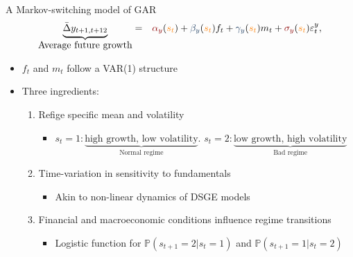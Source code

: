 \documentclass[xcolor=dvipsnames, xcolor=table, 10pt]{beamer}
\newcommand{\pb}[1]{{\color{fedblue}#1}}
\newcommand{\rr}[1]{{\color{darkred}#1}}
\newcommand{\orr}[1]{{\color{orange}#1}}
\begin{document}
\begin{frame}{A Markov-switching model of GAR}
\label{main:msmodel}
\vspace*{-0.2in}
\begin{eqnarray*}
\underbrace{\bar{\Delta} {y}_{t+1,t+12}}_{\mbox{Average future growth}} &=& \rr{\alpha_y} (\orr{s_t}) + \pb{\beta_y} (\orr{s_t}) {f_t} + \pb{\gamma_y} (\orr{s_t}) m_t + \rr{\sigma_y} (\orr{s_t}) \varepsilon^y_t, \label{eq:MS_growth}%
\end{eqnarray*}

\begin{itemize}
\item $f_t$ and $m_t$ follow a VAR(1) structure \hyperlink{app:msmodel}{}
\medskip
\item{Three ingredients:}
\medskip
    \begin{enumerate}
    \item \rr{Refige specific mean and volatility}
      \begin{itemize}
        \medskip
      \item $s_t=1: \underbrace{\mbox{high growth, low volatility}}_{\mbox{Normal regime}}$. $ s_t=2: \underbrace{\mbox{low growth, high volatility}}_{\mbox{Bad regime}}$
      \end{itemize}
      \bigskip
    \item \pb{Time-variation in sensitivity to fundamentals}
      \begin{itemize}
        \medskip
      \item Akin to non-linear dynamics of DSGE models\\ \citep{GKP2019,FernandezVillaverdeHurtadoGalo2019,ACHSV2020}
      \end{itemize}
      \bigskip
\item \orr{Financial and macroeconomic conditions influence regime transitions}
\begin{itemize}
\medskip
\item Logistic function for $\mathbb{P}\left(s_{t+1} = 2 | s_t = 1\right)$ and $\mathbb{P}\left(s_{t+1} = 1 | s_t = 2\right)$
\end{itemize}
\end{enumerate}
\end{itemize}

\end{frame}


\end{document}
